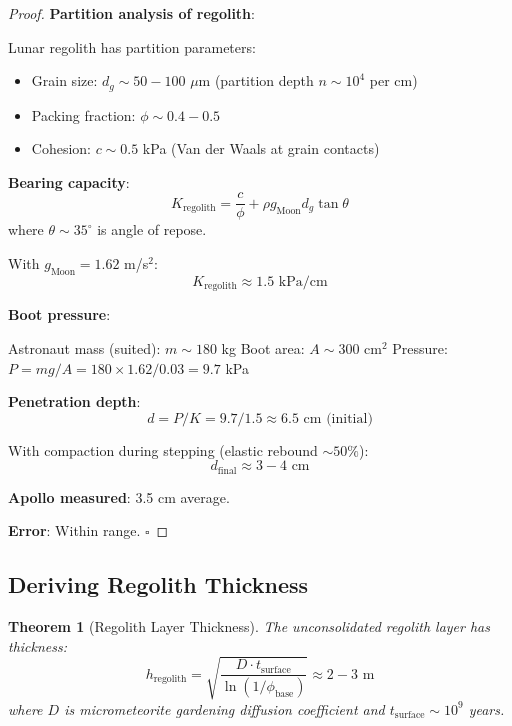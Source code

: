 \documentclass[12pt,a4paper]{article}
\newtheorem{theorem}{Theorem}[section]
\theoremstyle{definition}
\theoremstyle{remark}
\begin{document}
\begin{proof}
\textbf{Partition analysis of regolith}:

Lunar regolith has partition parameters:
\begin{itemize}
    \item Grain size: $d_g \sim 50-100$ $\mu$m (partition depth $n \sim 10^4$ per cm)
    \item Packing fraction: $\phi \sim 0.4-0.5$
    \item Cohesion: $c \sim 0.5$ kPa (Van der Waals at grain contacts)
\end{itemize}

\textbf{Bearing capacity}:
\begin{equation}
K_{\text{regolith}} = \frac{c}{\phi} + \rho g_{\text{Moon}} d_g \tan\theta
\end{equation}
where $\theta \sim 35^\circ$ is angle of repose.

With $g_{\text{Moon}} = 1.62$ m/s$^2$:
\begin{equation}
K_{\text{regolith}} \approx 1.5 \text{ kPa/cm}
\end{equation}

\textbf{Boot pressure}:

Astronaut mass (suited): $m \sim 180$ kg
Boot area: $A \sim 300$ cm$^2$
Pressure: $P = mg/A = 180 \times 1.62 / 0.03 = 9.7$ kPa

\textbf{Penetration depth}:
\begin{equation}
d = P/K = 9.7 / 1.5 \approx 6.5 \text{ cm (initial)}
\end{equation}

With compaction during stepping (elastic rebound $\sim 50\%$):
\begin{equation}
d_{\text{final}} \approx 3-4 \text{ cm}
\end{equation}

\textbf{Apollo measured}: 3.5 cm average.

\textbf{Error}: Within range. $\square$
\end{proof}

\subsection{Deriving Regolith Thickness}

\begin{theorem}[Regolith Layer Thickness]
\label{thm:regolith}
The unconsolidated regolith layer has thickness:
\begin{equation}
h_{\text{regolith}} = \sqrt{\frac{D \cdot t_{\text{surface}}}{\ln(1/\phi_{\text{base}})}} \approx 2-3 \text{ m}
\end{equation}
where $D$ is micrometeorite gardening diffusion coefficient and $t_{\text{surface}} \sim 10^9$ years.
\end{theorem}
\end{document}
